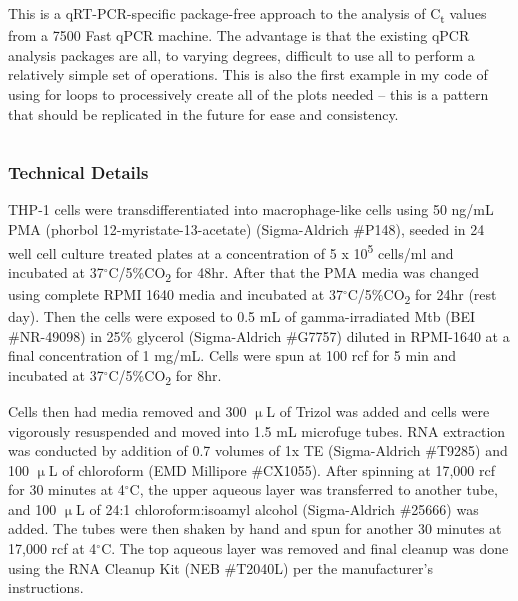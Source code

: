 \begin{code}
\caption{This is a qRT-PCR-specific package-free approach to the analysis of C\textsubscript{t} values from a 7500 Fast qPCR machine. The advantage is that the existing qPCR analysis packages are all, to varying degrees, difficult to use all to perform a relatively simple set of operations. This is also the first example in my code of using for loops to processively create all of the plots needed -- this is a pattern that should be replicated in the future for ease and consistency.}
\label{qpcranalysis}

\inputminted[breaklines,frame=single,fontsize=\small]{r}{source/qPCR_analysis.R}

\end{code}

\subsubsection{Technical Details}\label{rnaextraction}

THP-1 cells were transdifferentiated into macrophage-like cells using 50 ng/mL PMA (phorbol 12-myristate-13-acetate) (Sigma-Aldrich \#P148), seeded in 24 well cell culture treated plates at a concentration of 5 x 10\textsuperscript{5} cells/ml and incubated at 37$^{\circ}$C/5\%CO\textsubscript{2} for 48hr. After that the PMA media was changed using complete RPMI 1640 media and incubated at 37$^{\circ}$C/5\%CO\textsubscript{2} for 24hr (rest day). Then the cells were exposed to 0.5 mL of gamma-irradiated Mtb (BEI \#NR-49098) in 25\% glycerol (Sigma-Aldrich \#G7757) diluted in RPMI-1640 at a final concentration of 1 mg/mL. Cells were spun at 100 rcf for 5 min and incubated at 37$^{\circ}$C/5\%CO\textsubscript{2} for 8hr.

Cells then had media removed and 300 $\upmu$L of Trizol was added and cells were vigorously resuspended and moved into 1.5 mL microfuge tubes. RNA extraction was conducted by addition of 0.7 volumes of 1x TE (Sigma-Aldrich \#T9285) and 100 $\upmu$L of chloroform (EMD Millipore \#CX1055). After spinning at 17,000 rcf for 30 minutes at 4$^{\circ}$C, the upper aqueous layer was transferred to another tube, and 100 $\upmu$L of 24:1 chloroform:isoamyl alcohol (Sigma-Aldrich \#25666) was added. The tubes were then shaken by hand and spun for another 30 minutes at 17,000 rcf at 4$^{\circ}$C. The top aqueous layer was removed and final cleanup was done using the RNA Cleanup Kit (NEB \#T2040L) per the manufacturer's instructions.

